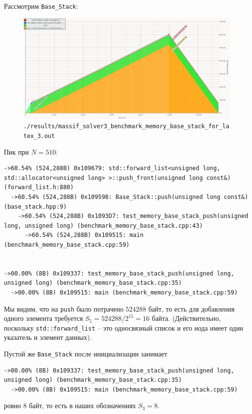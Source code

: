 Рассмотрим \texttt{Base_Stack}:
\begin{figure}[H]
  \centering
  \includegraphics[width=1.0\textwidth]{../../resources/memory_consumption_of_solver3_benchmark_memory_base_stack_with_forward_list_1.png}
  \caption{\texttt{./results/massif_solver3_benchmark_memory_base_stack_for_latex_3.out}}
\end{figure}
Пик при \(N = 510\):
\begin{lstlisting}[caption={}, label={}, style=style_code_block]
->60.54% (524,288B) 0x109679: std::forward_list<unsigned long, std::allocator<unsigned long> >::push_front(unsigned long const&) (forward_list.h:880)
  ->60.54% (524,288B) 0x109598: Base_Stack::push(unsigned long const&) (base_stack.hpp:9)
    ->60.54% (524,288B) 0x1093D7: test_memory_base_stack_push(unsigned long, unsigned long) (benchmark_memory_base_stack.cpp:43)
      ->60.54% (524,288B) 0x109515: main (benchmark_memory_base_stack.cpp:59)
        

->00.00% (8B) 0x109337: test_memory_base_stack_push(unsigned long, unsigned long) (benchmark_memory_base_stack.cpp:35)
  ->00.00% (8B) 0x109515: main (benchmark_memory_base_stack.cpp:59)
\end{lstlisting}
Мы видим, что на \texttt{push} было потрачено \(524288\) байт, то есть для добавления одного элемента требуется \(S_5 = 524288/2^{15} = 16\) байта. (Действительно, поскольку \texttt{std::forward_list} -- это односвязный список и его нода имеет один указатель и элемент данных). 

Пустой же \texttt{Base_Stack} после инициализации занимает 
\begin{lstlisting}[caption={}, label={}, style=style_code_block]
->00.00% (8B) 0x109337: test_memory_base_stack_push(unsigned long, unsigned long) (benchmark_memory_base_stack.cpp:35)
  ->00.00% (8B) 0x109515: main (benchmark_memory_base_stack.cpp:59)
\end{lstlisting}
ровно \(8\) байт, то есть в наших обозначениях \(S_3 = 8\).

